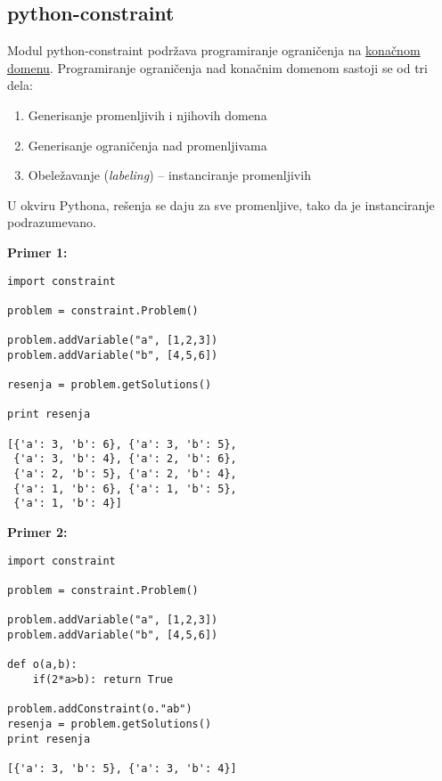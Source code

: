 \documentclass[../main.tex]{subfiles}
\begin{document}
\subsection{python-constraint}												%

Modul python-constraint podržava programiranje ograničenja na \underline{konačnom domenu}. Programiranje ograničenja nad konačnim domenom sastoji se od tri dela:
\begin{enumerate}
	\item Generisanje promenljivih i njihovih domena
	\item Generisanje ograničenja nad promenljivama
	\item Obeležavanje ({\it labeling}) -- instanciranje promenljivih
\end{enumerate}
U okviru Pythona, rešenja se daju za sve promenljive, tako da je instanciranje podrazumevano.

\begin{multicols}{2}

	{\bf Primer 1:} \hfill		%
	\begin{boxprimer}
	\begin{Verbatim}[samepage=true]
import constraint
	
problem = constraint.Problem()
		
problem.addVariable("a", [1,2,3])
problem.addVariable("b", [4,5,6])

resenja = problem.getSolutions()

print resenja

[{'a': 3, 'b': 6}, {'a': 3, 'b': 5}, 
 {'a': 3, 'b': 4}, {'a': 2, 'b': 6},
 {'a': 2, 'b': 5}, {'a': 2, 'b': 4},
 {'a': 1, 'b': 6}, {'a': 1, 'b': 5},
 {'a': 1, 'b': 4}]
	\end{Verbatim}
	\end{boxprimer}
	
	\columnbreak
	
	{\bf Primer 2:} \hfill
	\begin{boxprimer}
	\begin{Verbatim}[samepage=true]
import constraint

problem = constraint.Problem()
	
problem.addVariable("a", [1,2,3])
problem.addVariable("b", [4,5,6])

def o(a,b):
	if(2*a>b): return True

problem.addConstraint(o."ab")
resenja = problem.getSolutions()
print resenja

[{'a': 3, 'b': 5}, {'a': 3, 'b': 4}]
		\end{Verbatim}
	\end{boxprimer}
\end{multicols}
\end{document}
